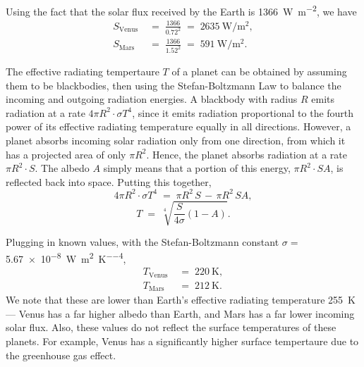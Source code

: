\documentclass[10pt]{article}
\begin{document}
        Using the fact that the solar flux received by the Earth is \SI{1366}{\watt\per\metre^2}, we have
        \begin{align*}
                S_{\text{Venus}} \;&=\; \frac{1366}{0.72^2} \;=\; \SI{2635}{\watt\per\metre^2},\\
                S_{\text{Mars}} \;&=\; \frac{1366}{1.52^2} \;=\; \SI{591}{\watt\per\metre^2}.
        \end{align*}

        The effective radiating tempertaure $T$ of a planet can be obtained by assuming them to be blackbodies, then using
        the Stefan-Boltzmann Law to balance the incoming and outgoing radiation energies. A blackbody with radius $R$ emits 
        radiation at a rate $4\pi R^2\cdot \sigma T^4$, since it emits radiation proportional to the fourth power of its effective radiating
        temperature equally in all directions. However, a planet absorbs incoming solar radiation only from one direction,
        from which it has a projected area of only $\pi R^2$. Hence, the planet absorbs radiation at a rate $\pi R^2\cdot S$.
        The albedo $A$ simply means that a portion of this energy, $\pi R^2\cdot SA$, is reflected back into space. Putting this together,
        \[
        4\pi R^2\cdot \sigma T^4 \;=\; \pi R^2\,S \,-\, \pi R^2\,SA,
        \]
        \[
        T \;=\; \sqrt[4]{\frac{S}{4\sigma}(1 - A)}.
        \]

        Plugging in known values, with the Stefan-Boltzmann constant $\sigma = $ \SI{5.67e-8}{\watt\per\metre^2\per\kelvin^4},
        \begin{align*}
                T_{\text{Venus}} \;&=\; \SI{220}{\kelvin}, \\
                T_{\text{Mars}} \;&=\; \SI{212}{\kelvin}.
        \end{align*}
        We note that these are lower than Earth's effective radiating temperature \SI{255}{\kelvin} --- Venus has a far higher albedo than
        Earth, and Mars has a far lower incoming solar flux. Also, these values do not reflect the surface temperatures of these planets.
        For example, Venus has a significantly higher surface tempertaure due to the greenhouse gas effect.
\end{document}
